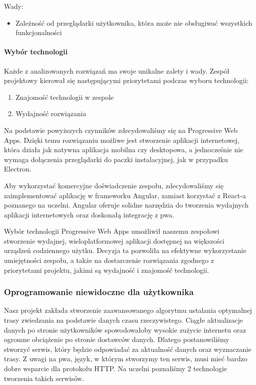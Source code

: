 Wady:
\begin{itemize}
    \item Zależność od przeglądarki użytkownika, która może nie obsługiwać wszystkich funkcjonalności
\end{itemize}

\paragraph{Wybór technologii}
Każde z analizowanych rozwiązań ma swoje unikalne zalety i wady.
Zespół projektowy kierował się następującymi priorytetami podczas wyboru technologii:

\begin{enumerate}
    \item Znajomość technologii w zespole
    \item Wydajność rozwiązania
\end{enumerate}

Na podstawie powyższych czynników zdecydowaliśmy się na Progressive Web Apps.
Dzięki temu rozwiązaniu możliwe jest stworzenie aplikacji internetowej, która działa jak natywna aplikacja mobilna czy desktopowa, a jednocześnie nie wymaga dołączenia przeglądarki do paczki instalacyjnej, jak w przypadku Electron.

Aby wykorzystać komercyjne doświadczenie zespołu, zdecydowaliśmy się zaimplementować aplikację w frameworku Angular, zamiast korzystać z React-a poznanego na uczelni.
Angular oferuje solidne narzędzia do tworzenia wydajnych aplikacji internetowych oraz doskonałą integrację z \acrshort{pwa}.

Wybór technologii Progressive Web Apps umożliwił naszemu zespołowi stworzenie wydajnej, wieloplatformowej aplikacji dostępnej na większości urządzeń codziennego użytku.
Decyzja ta pozwoliła na efektywne wykorzystanie umiejętności zespołu, a także na dostarczenie rozwiązania zgodnego z priorytetami projektu, jakimi są wydajność i znajomość technologii.

\subsubsection{Oprogramowanie niewidoczne dla użytkownika}
Nasz projekt zakłada stworzenie zaawansowanego algorytmu ustalania optymalnej trasy zwiedzania na podstawie danych czasu rzeczywistego.
Ciągłe aktualizacje danych po stronie użytkowników spowodowałoby wysokie zużycie internetu oraz ogromne obciążenie po stronie dostawców danych.
Dlatego postanowiliśmy stworzyć serwis, który będzie odpowiadać za aktualność danych oraz wyznaczanie trasy.
Z uwagi na \acrshort{pwa}, język, w którym stworzymy ten serwis, musi mieć bardzo dobre wsparcie dla protokołu HTTP\@.
Na uczelni poznaliśmy 2 technologie tworzenia takich serwisów.

